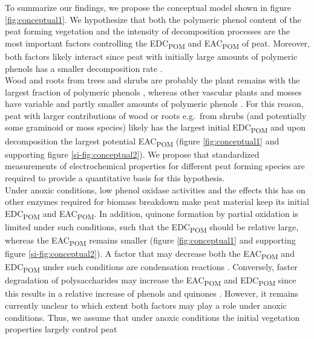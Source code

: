 \documentclass[draft,linenumbers]{agujournal2018}
\begin{document}
To summarize our findings, we propose the conceptual model shown in
figure \ref{fig:conceptual1}. We hypothesize that both the polymeric
phenol content of the peat forming vegetation and the intensity of
decomposition processes are the most important factors controlling the
EDC\textsubscript{POM} and EAC\textsubscript{POM} of peat. Moreover,
both factors likely interact since peat with initially large amounts of
polymeric phenols has a smaller decomposition rate
\citep{Bengtsson.2018}.\\
Wood and roots from trees and shrubs are probably the plant remains with
the largest fraction of polymeric phenols
\citep{Benner.1984, Williams.1998, Strakova.2010, Wang.2015, Hodgkins.2018},
whereas other vascular plants and mosses have variable and partly
smaller amounts of polymeric phenols
\citep{Williams.1998, Scheffer.2001, Strakova.2010, Wang.2015, Bengtsson.2018, Zak.2019}.
For this reason, peat with larger contributions of wood or roots
e.g.~from shrubs (and potentially some graminoid or moss species) likely
has the largest initial EDC\textsubscript{POM} and upon decomposition
the largest potential EAC\textsubscript{POM} (figure
\ref{fig:conceptual1} and supporting figure \ref{si-fig:conceptual2}).
We propose that standardized measurements of electrochemical properties
for different peat forming species are required to provide a
quantitative basis for this hypothesis.\\
Under anoxic conditions, low phenol oxidase activities and the effects
this has on other enzymes required for biomass breakdown
\citep{Fenner.2011} make peat material keep its initial
EDC\textsubscript{POM} and EAC\textsubscript{POM}. In addition, quinone
formation by partial oxidation is limited under such conditions, such
that the EDC\textsubscript{POM} should be relative large, whereas the
EAC\textsubscript{POM} remains smaller (figure \ref{fig:conceptual1} and
supporting figure \ref{si-fig:conceptual2}). A factor that may decrease
both the EAC\textsubscript{POM} and EDC\textsubscript{POM} under such
conditions are condensation reactions
\citep{Hotta.2002, Uchimiya.2009, Bolton.2018, Zhao.2020, Olk.2006, Heitmann.2006, Yu.2016}.
Conversely, faster degradation of polysaccharides may increase the
EAC\textsubscript{POM} and EDC\textsubscript{POM} since this results in
a relative increase of phenols and quinones \citep{Benner.1984}.
However, it remains currently unclear to which extent both factors may
play a role under anoxic conditions. Thus, we assume that under anoxic
conditions the initial vegetation properties largely control peat
\end{document}
